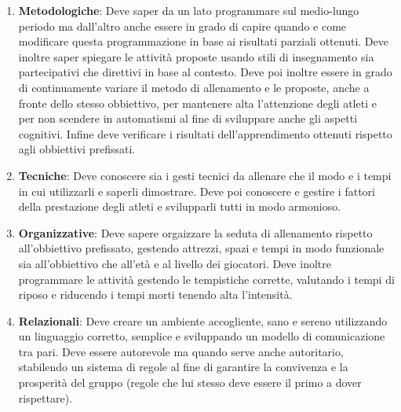 \documentclass[../uefaC.tex]{subfiles}
\begin{document}
\begin{enumerate}
    \item\textbf{Metodologiche}: Deve saper da un lato programmare sul medio-lungo periodo ma dall'altro anche essere in grado di capire quando e come modificare questa programmazione in base ai risultati parziali ottenuti. Deve inoltre saper spiegare le attività proposte usando stili di insegnamento sia partecipativi che direttivi in base al contesto. Deve poi inoltre essere in grado di continuamente variare il metodo di allenamento e le proposte, anche a fronte dello stesso obbiettivo, per mantenere alta l'attenzione degli atleti e per non scendere in automatismi al fine di sviluppare anche gli aspetti cognitivi. Infine deve verificare i risultati dell'apprendimento ottenuti rispetto agli obbiettivi prefissati.
    \item\textbf{Tecniche}: Deve conoscere sia i gesti tecnici da allenare che il modo e i tempi in cui utilizzarli e saperli dimostrare. Deve poi conoscere e gestire i fattori della prestazione degli atleti e svilupparli tutti in modo armonioso.
    \item\textbf{Organizzative}: Deve sapere orgaizzare la seduta di allenamento rispetto all'obbiettivo prefissato, gestendo attrezzi, spazi e tempi in modo funzionale sia all'obbiettivo che all'età e al livello dei giocatori. Deve inoltre programmare le attività gestendo le tempistiche corrette, valutando i tempi di riposo e riducendo i tempi morti tenendo alta l'intensità.
    \item\textbf{Relazionali}: Deve creare un ambiente accogliente, sano e sereno utilizzando un linguaggio corretto, semplice e sviluppando un modello di comunicazione tra pari. Deve essere autorevole ma quando serve anche autoritario, stabilendo un sistema di regole al fine di garantire la convivenza e la prosperità del gruppo (regole che lui stesso deve essere il primo a dover rispettare).
\end{enumerate}
\end{document}
